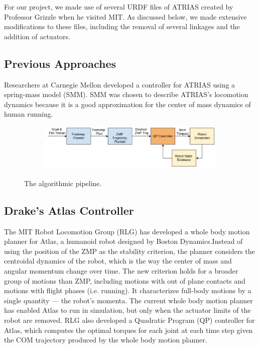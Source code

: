 \documentclass[letterpaper, 10 pt, conference]{ieeeconf}  %
\begin{document}
For our project, we made use of several URDF files of ATRIAS created by Professor Grizzle when he visited MIT. As discussed below, we made extensive modifications to these files, including the removal of several linkages and the addition of actuators.

\subsection{Previous Approaches}

Researchers at Carnegie Mellon developed a controller for ATRIAS using a spring-mass model (SMM). SMM was chosen to describe ATRIAS's locomotion dynamics because it is a good approximation for the center of mass dynamics of human running. \cite{hereid14}

  \begin{figure}[tbp]
  \centering
  \begin{subfigure}[b]{0.7\textwidth}
    \centering
    \includegraphics[width=\textwidth] {figures/6_832blockdiagramsmall.jpg}
    \label{fig:pipeline1}
  \end{subfigure}\hfill
  \caption{The algorithmic pipeline.}
  \label{fig:pipeline}
\end{figure}

\subsection{Drake's Atlas Controller}

The MIT Robot Locomotion Group (RLG) has developed a whole body motion planner for Atlas, a humanoid robot designed by Boston Dynamics. ​Instead of using ​the position of the ​ZMP as ​the stability criterion, ​the planner considers the centroidal dynamics of the robot, which is the way the center of mass and angular momentum change over time. The new criterion holds for a broader group of motions than ZMP, including motions with out of plane contacts and motions with flight phases (i.e. running). It characterizes full-body motions by a single quantity --- the robot’s momenta. The current whole body motion planner has enabled Atlas to run in simulation, but only when the actuator limits of the robot are removed. \cite{dai14} RLG also developed a Quadratic Program (QP) controller for Atlas, which computes the optimal torques for each joint at each time step given the COM trajectory produced by the whole body motion planner. \cite{kuindersma13}
\end{document}
